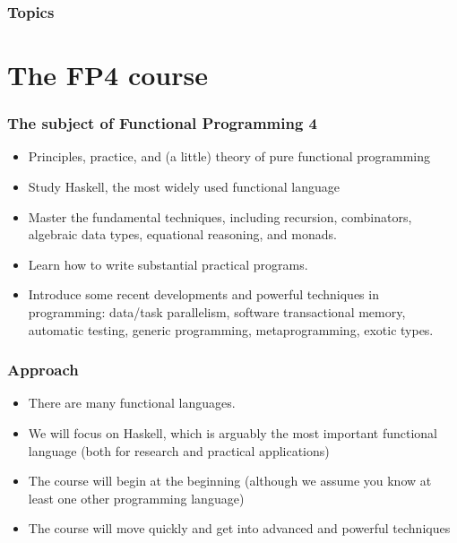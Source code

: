 \documentclass{beamer}
\begin{document}
\begin{frame}
  \PresentationTitleSlide
\end{frame}

\begin{frame}
 \frametitle{Topics}
 \tableofcontents
\end{frame}


\section{The FP4 course}

\begin{frame}
\frametitle{The subject of Functional Programming 4}

\begin{itemize}
\item Principles, practice, and (a little) theory of pure
  functional programming
\item Study Haskell, the most widely used functional language
\item Master the fundamental techniques, including recursion,
  combinators, algebraic data types, equational reasoning, and
  monads.
\item Learn how to write substantial practical programs.
\item Introduce some recent developments and powerful techniques in
  programming: data/task parallelism, software transactional
  memory, automatic testing, generic programming, metaprogramming,
  exotic types.
\end{itemize}
\end{frame}
\begin{frame}
\frametitle{Approach}

\begin{itemize}
\item There are many functional languages.
\item We will focus on Haskell, which is arguably the most
  important functional language (both for research and practical
  applications)
\item The course will begin at the beginning (although we assume you know at least one other programming language)
\item The course will move quickly and get into advanced and powerful
  techniques

\end{itemize}

\end{frame}
\end{document}

